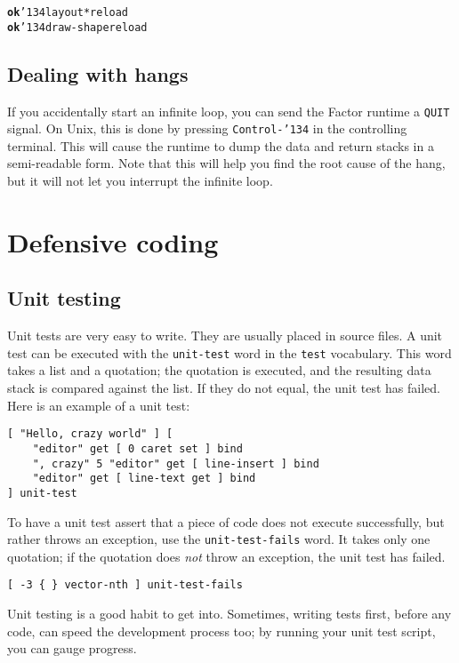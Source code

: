 \documentclass{report}
\newcommand{\bs}{\char'134}
\begin{document}
\begin{alltt}
\textbf{ok} \bs layout* reload
\textbf{ok} \bs draw-shape reload
\end{alltt}

\subsection{Dealing with hangs}

If you accidentally start an infinite loop, you can send the Factor runtime a \texttt{QUIT} signal. On Unix, this is done by pressing \texttt{Control-\bs} in the controlling terminal. This will cause the runtime to dump the data and return stacks in a semi-readable form. Note that this will help you find the root cause of the hang, but it will not let you interrupt the infinite loop.


\section{Defensive coding}

\subsection{Unit testing}

Unit tests are very easy to write. They are usually placed in source files. A unit test can be executed with the \texttt{unit-test} word in the \texttt{test} vocabulary. This word takes a list and a quotation; the quotation is executed, and the resulting data stack is compared against the list. If they do not equal, the unit test has failed. Here is an example of a unit test:

\begin{verbatim}
[ "Hello, crazy world" ] [
    "editor" get [ 0 caret set ] bind
    ", crazy" 5 "editor" get [ line-insert ] bind
    "editor" get [ line-text get ] bind
] unit-test
\end{verbatim}

To have a unit test assert that a piece of code does not execute successfully, but rather throws an exception, use the \texttt{unit-test-fails} word. It takes only one quotation; if the quotation does \emph{not} throw an exception, the unit test has failed.

\begin{verbatim}
[ -3 { } vector-nth ] unit-test-fails
\end{verbatim}

Unit testing is a good habit to get into. Sometimes, writing tests first, before any code, can speed the development process too; by running your unit test script, you can gauge progress.
\end{document}
